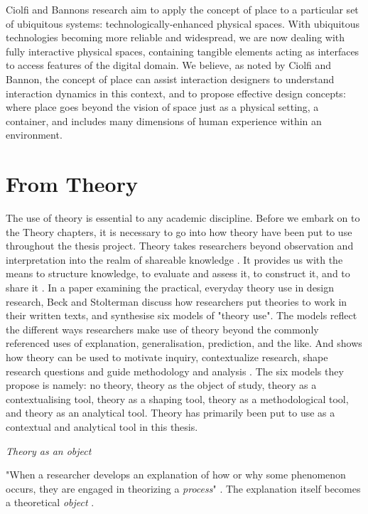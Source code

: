 Ciolfi and Bannons research aim to apply the concept of place to a particular set of ubiquitous systems: technologically-enhanced physical spaces. With ubiquitous technologies becoming more reliable and widespread, we are now dealing with fully interactive physical spaces, containing tangible elements acting as interfaces to access features of the digital domain. We believe, as noted by Ciolfi and Bannon, the concept of place can assist interaction designers to understand interaction dynamics in this context, and to propose effective design concepts: where place goes beyond the vision of space just as a physical setting, a container, and includes many dimensions of human experience within an environment\autocite[p. 221]{ciolfi_space_2005}.





\section{From Theory}
The use of theory is essential to any academic discipline. Before we embark on to the Theory chapters, it is necessary to go into how theory have been put to use throughout the thesis project. Theory takes researchers beyond observation and interpretation into the realm of shareable knowledge \autocite[p. 126]{beck_examining_2016}. It provides us with the means to structure knowledge, to evaluate and assess it, to construct it, and to share it \autocite[p. 126]{beck_examining_2016}. In a paper examining the practical, everyday theory use in design research, Beck and Stolterman discuss how researchers put theories to work in their written texts, and synthesise six models of "theory use". The models reflect the different ways researchers make use of theory beyond the commonly referenced uses of explanation, generalisation, prediction, and the like. And shows how theory can be used to motivate inquiry, contextualize research, shape research questions and guide methodology and analysis \autocite[p. 134]{beck_examining_2016}. The six models they propose is namely: no theory, theory as the object of study, theory as a contextualising tool, theory as a shaping tool, theory as a methodological tool, and theory as an analytical tool. Theory has primarily been put to use as a contextual and analytical tool in this thesis. 


\par \emph{Theory as an object} \par
"When a researcher develops an explanation of how or why some phenomenon occurs, they are engaged in theorizing a \emph{process}" \autocite[p.126]{beck_examining_2016}. The explanation itself becomes a theoretical \emph{object} \autocite[p. 126]{beck_examining_2016}.  


